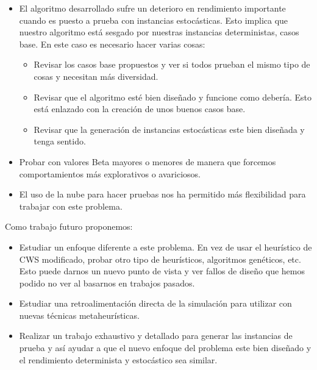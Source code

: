 \documentclass[11pt]{article} %
\begin{document}
\begin{enumerate}
\begin{itemize}
	\item El algoritmo desarrollado sufre un deterioro en rendimiento importante cuando es puesto a prueba con instancias estocásticas. Esto implica que nuestro algoritmo está sesgado por nuestras instancias deterministas, casos base.
	En este caso es necesario hacer varias cosas:
		\begin{itemize}
		\item Revisar los casos base propuestos y ver si todos prueban el mismo tipo de cosas y necesitan más diversidad.
		\item Revisar que el algoritmo esté bien diseñado y funcione como debería. Esto está enlazado con la creación de unos buenos casos base.
		\item Revisar que la generación de instancias estocásticas este bien diseñada y tenga sentido.
		\end{itemize}
	\item Probar con valores Beta mayores o menores de manera que forcemos comportamientos más explorativos o avariciosos.
	\item El uso de la nube para hacer pruebas nos ha permitido más flexibilidad para trabajar con este problema.
\end{itemize}

Como trabajo futuro proponemos:
\begin{itemize}
	\item Estudiar un enfoque diferente a este problema. En vez de usar el heurístico de CWS modificado, probar otro tipo de heurísticos, algoritmos genéticos, etc. Esto puede darnos un nuevo punto de vista y ver fallos de diseño que hemos podido no ver al basarnos en trabajos pasados.
	\item Estudiar una retroalimentación directa de la simulación para utilizar con nuevas técnicas metaheurísticas.
	\item Realizar un trabajo exhaustivo y detallado para generar las instancias de prueba y así ayudar a que el nuevo enfoque del problema este bien diseñado y el rendimiento determinista y estocástico sea similar.
\end{itemize}

 \end{enumerate}
\end{document}
